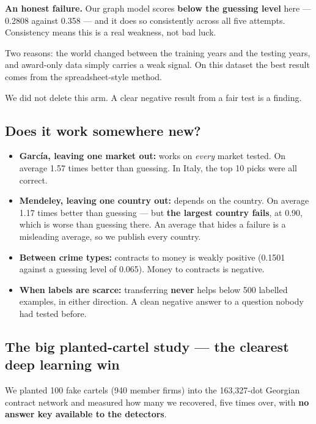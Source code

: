 \documentclass[11pt,a4paper]{article}
\begin{document}
\begin{warnbox}
\textbf{An honest failure.} Our graph model scores \textbf{below the guessing
level} here --- 0.2808 against 0.358 --- and it does so consistently across all
five attempts. Consistency means this is a real weakness, not bad luck.

Two reasons: the world changed between the training years and the testing years,
and award-only data simply carries a weak signal. On this dataset the best result
comes from the spreadsheet-style method.

We did not delete this arm. A clear negative result from a fair test is a
finding.
\end{warnbox}

\subsection{Does it work somewhere new?}

\begin{itemize}
  \item \textbf{García, leaving one market out:} works on \emph{every} market
        tested. On average 1.57 times better than guessing. In Italy, the top 10
        picks were all correct.
  \item \textbf{Mendeley, leaving one country out:} depends on the country. On
        average 1.17 times better than guessing --- but \textbf{the largest country
        fails}, at 0.90, which is worse than guessing there. An average that hides
        a failure is a misleading average, so we publish every country.
  \item \textbf{Between crime types:} contracts to money is weakly positive (0.1501
        against a guessing level of 0.065). Money to contracts is negative.
  \item \textbf{When labels are scarce:} transferring \textbf{never} helps below
        500 labelled examples, in either direction. A clean negative answer to a
        question nobody had tested before.
\end{itemize}

\subsection{The big planted-cartel study --- the clearest deep learning win}

We planted 100 fake cartels (940 member firms) into the 163{,}327-dot Georgian
contract network and measured how many we recovered, five times over, with
\textbf{no answer key available to the detectors}.
\end{document}
